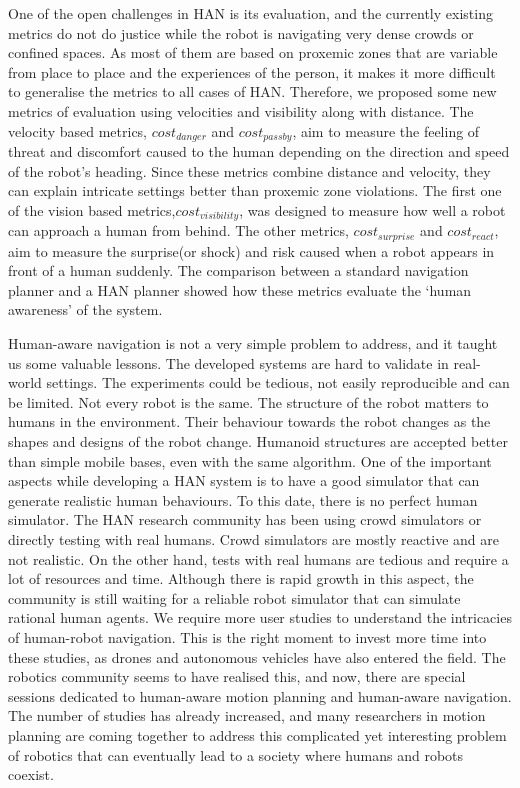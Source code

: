 One of the open challenges in HAN is its evaluation, and the currently existing metrics do not do justice while the robot is navigating very dense crowds or confined spaces. As most of them are based on proxemic zones that are variable from place to place and the experiences of the person, it makes it more difficult to generalise the metrics to all cases of HAN. Therefore, we proposed some new metrics of evaluation using velocities and visibility along with distance. The velocity based metrics, $cost_{danger}$ and $cost_{passby}$, aim to measure the feeling of threat and discomfort caused to the human depending on the direction and speed of the robot's heading. Since these metrics combine distance and velocity, they can explain intricate settings better than proxemic zone violations. The first one of the vision based metrics,$cost_{visibility}$, was designed to measure how well a robot can approach a human from behind. The other metrics, $cost_{surprise}$ and $cost_{react}$, aim to measure the surprise(or shock) and risk caused when a robot appears in front of a human suddenly. The comparison between a standard navigation planner and a HAN planner showed how these metrics evaluate the `human awareness' of the system.


Human-aware navigation is not a very simple problem to address, and it taught us some valuable lessons. The developed systems are hard to validate in real-world settings. The experiments could be tedious, not easily reproducible and can be limited. Not every robot is the same. The structure of the robot matters to humans in the environment. Their behaviour towards the robot changes as the shapes and designs of the robot change. Humanoid structures are accepted better than simple mobile bases, even with the same algorithm. One of the important aspects while developing a HAN system is to have a good simulator that can generate realistic human behaviours. To this date, there is no perfect human simulator. The HAN research community has been using crowd simulators or directly testing with real humans. Crowd simulators are mostly reactive and are not realistic. On the other hand, tests with real humans are tedious and require a lot of resources and time. Although there is rapid growth in this aspect, the community is still waiting for a reliable robot simulator that can simulate rational human agents. We require more user studies to understand the intricacies of human-robot navigation. This is the right moment to invest more time into these studies, as drones and autonomous vehicles have also entered the field. The robotics community seems to have realised this, and now, there are special sessions dedicated to human-aware motion planning and human-aware navigation. The number of studies has already increased, and many researchers in motion planning are coming together to address this complicated yet interesting problem of robotics that can eventually lead to a society where humans and robots coexist.

